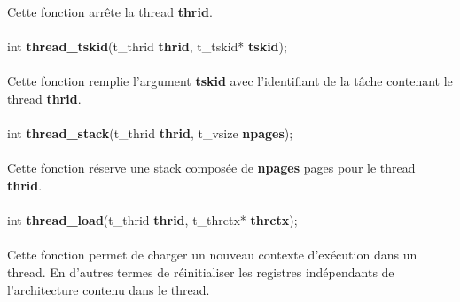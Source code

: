 \documentclass[10pt,a4wide]{article}
\begin{document}
Cette fonction arr\^ete la thread \textbf{thrid}.

\paragraph{}

\hspace{1.5cm}int \textbf{thread\_tskid}(t\_thrid \textbf{thrid},
                                         t\_tskid* \textbf{tskid});

\paragraph{}

Cette fonction remplie l'argument \textbf{tskid} avec l'identifiant de
la t\^ache contenant le thread \textbf{thrid}.

\paragraph{}

\hspace{1.5cm}int \textbf{thread\_stack}(t\_thrid \textbf{thrid},
                                         t\_vsize \textbf{npages});

\paragraph{}

Cette fonction r\'eserve une stack compos\'ee de \textbf{npages}
pages pour le thread \textbf{thrid}.

\paragraph{}

\hspace{1.5cm}int \textbf{thread\_load}(t\_thrid \textbf{thrid},
                                        t\_thrctx* \textbf{thrctx});

\paragraph{}

Cette fonction permet de charger un nouveau contexte d'ex\'ecution
dans un thread. En d'autres termes de r\'einitialiser les registres
ind\'ependants de l'architecture contenu dans le thread.

\paragraph{}
\end{document}
